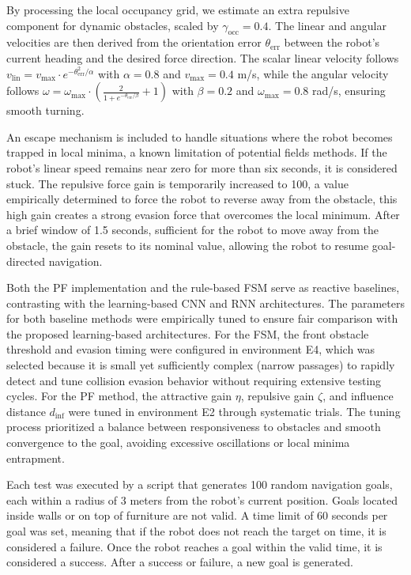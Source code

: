 \documentclass[robotics,article,submit,pdftex,moreauthors]{Definitions/mdpi}
\begin{document}
By processing the local occupancy grid, we estimate an extra repulsive component for dynamic obstacles, scaled by $\gamma_{\text{occ}} = 0.4$. The linear and angular velocities are then derived from the orientation error $\theta_{\text{err}}$ between the robot's current heading and the desired force direction. The scalar linear velocity follows $v_{\text{lin}} = v_{\max} \cdot e^{-\theta_{\text{err}}^2 / \alpha}$ with $\alpha = 0.8$ and $v_{\max} = 0.4$ m/s, while the angular velocity follows $\omega = \omega_{\max} \cdot \left(\frac{2}{1 + e^{-\theta_{\text{err}}/\beta}} + 1\right)$ with $\beta = 0.2$ and $\omega_{\max} = 0.8$ rad/s, ensuring smooth turning.

An escape mechanism is included to handle situations where the robot becomes trapped in local minima, a known limitation of potential fields methods. If the robot's linear speed remains near zero for more than six seconds, it is considered stuck. The repulsive force gain is temporarily increased to 100, a value empirically determined to force the robot to reverse away from the obstacle, this high gain creates a strong evasion force that overcomes the local minimum. After a brief window of 1.5 seconds, sufficient for the robot to move away from the obstacle, the gain resets to its nominal value, allowing the robot to resume goal-directed navigation.

Both the PF implementation and the rule-based FSM serve as reactive baselines, contrasting with the learning-based CNN and RNN architectures. The parameters for both baseline methods were empirically tuned to ensure fair comparison with the proposed learning-based architectures. For the FSM, the front obstacle threshold and evasion timing were configured in environment E4,  which was selected because it is small yet sufficiently complex (narrow passages) to rapidly detect and tune collision evasion behavior without requiring extensive testing cycles. For the PF method, the attractive gain $\eta$, repulsive gain $\zeta$, and influence distance $d_{\text{inf}}$ were tuned in environment E2 through systematic trials. The tuning process prioritized a balance between responsiveness to obstacles and smooth convergence to the goal, avoiding excessive oscillations or local minima entrapment.

Each test was executed by a script that generates 100 random navigation goals, each within a radius of 3 meters from the robot's current position. Goals located inside walls or on top of furniture are not valid. A time limit of 60 seconds per goal was set, meaning that if the robot does not reach the target on time, it is considered a failure. Once the robot reaches a goal within the valid time, it is considered a success. After a success or failure, a new goal is generated.
\end{document}
